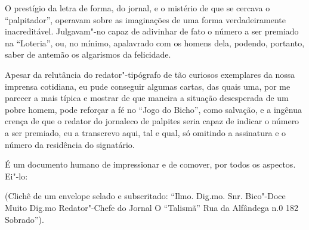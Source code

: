 O prestígio da letra de forma, do jornal, e o mistério de que se cercava
o ``palpitador'', operavam sobre as imaginações de uma forma
verdadeiramente inacreditável. Julgavam"-no capaz de adivinhar de fato o
número a ser premiado na ``Loteria'', ou, no mínimo, apalavrado com os
homens dela, podendo, portanto, saber de antemão os algarismos da
felicidade.

Apesar da relutância do redator"-tipógrafo de tão curiosos exemplares da
nossa imprensa cotidiana, eu pude conseguir algumas cartas, das quais
uma, por me parecer a mais típica e mostrar de que maneira a situação
desesperada de um pobre homem, pode reforçar a fé no ``Jogo do Bicho'',
como salvação, e a ingênua crença de que o redator do jornaleco de
palpites seria capaz de indicar o número a ser premiado, eu a transcrevo
aqui, tal e qual, só omitindo a assinatura e o número da residência do
signatário.

É um documento humano de impressionar e de comover, por todos os
aspectos. Ei"-lo:

(Clichê de um envelope selado e subscritado: ``Ilmo. Dig.mo. Snr.
Bico"-Doce Muito Dig.mo Redator"-Chefe do Jornal O ``Talismã'' Rua da
Alfândega n.0 182 Sobrado'').

